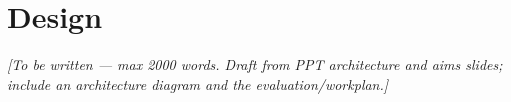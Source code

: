 \chapter{Design}
\label{ch:design}

\textit{[To be written — max 2000 words. Draft from PPT architecture and aims
slides; include an architecture diagram and the evaluation/workplan.]}
